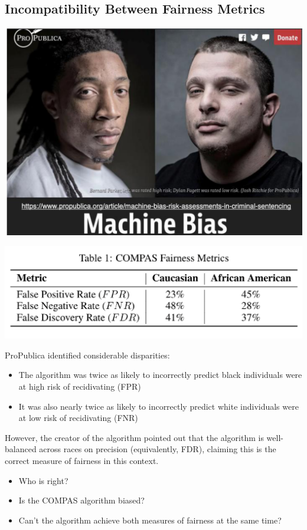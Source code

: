 \documentclass[11pt]{article}
\theoremstyle{definition}
\begin{document}
\subsection{Incompatibility Between Fairness Metrics}
\includegraphics[width=\textwidth/2]{4.png}

\includegraphics[width=\textwidth/2]{5.png}

ProPublica identified considerable disparities:
\begin{itemize}
    \item The algorithm was twice as likely to incorrectly predict black individuals were
    at high risk of recidivating (FPR)
    \item It was also nearly twice as likely to incorrectly predict white individuals were
    at low risk of recidivating (FNR)
\end{itemize}
However, the creator of the algorithm pointed out that the algorithm is well-
balanced across races on precision (equivalently, FDR), claiming this is the
correct measure of fairness in this context.

\begin{itemize}
    \item Who is right?
    \item Is the COMPAS algorithm biased?
    \item Can’t the algorithm achieve both
    measures of fairness at the same time?
\end{itemize}
\end{document}
